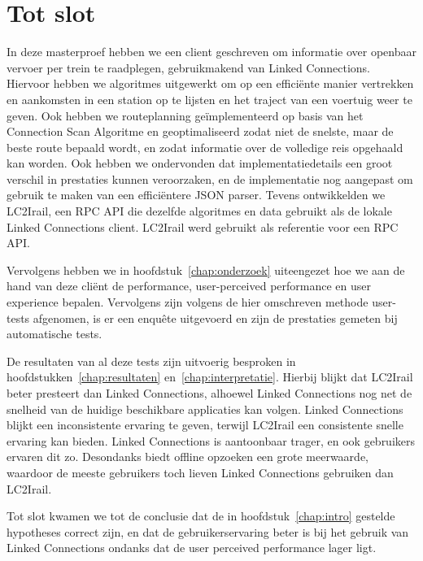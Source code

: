 \section{Tot slot}
	
In deze masterproef hebben we een client geschreven om informatie over openbaar vervoer per trein te raadplegen, gebruikmakend van Linked Connections. Hiervoor hebben we algoritmes uitgewerkt om op een efficiënte manier vertrekken en aankomsten in een station op te lijsten en het traject van een voertuig weer te geven. Ook hebben we routeplanning geïmplementeerd op basis van het Connection Scan Algoritme en geoptimaliseerd zodat niet de snelste, maar de beste route bepaald wordt, en zodat informatie over de volledige reis opgehaald kan worden. Ook hebben we ondervonden dat implementatiedetails een groot verschil in prestaties kunnen veroorzaken, en de implementatie nog aangepast om gebruik te maken van een efficiëntere JSON parser. Tevens ontwikkelden we LC2Irail, een RPC API die dezelfde algoritmes en data gebruikt als de lokale Linked Connections client. LC2Irail werd gebruikt als referentie voor een RPC API.
	
Vervolgens hebben we in hoofdstuk~\ref{chap:onderzoek} uiteengezet hoe we aan de hand van deze cliënt de performance, user-perceived performance en user experience bepalen. Vervolgens zijn volgens de hier omschreven methode user-tests afgenomen, is er een enquête uitgevoerd en zijn de prestaties gemeten bij automatische tests. 
	
De resultaten van al deze tests zijn uitvoerig besproken in hoofdstukken~\ref{chap:resultaten} en~\ref{chap:interpretatie}. Hierbij blijkt dat LC2Irail beter presteert dan Linked Connections, alhoewel Linked Connections nog net de snelheid van de huidige beschikbare applicaties kan volgen. Linked Connections blijkt een inconsistente ervaring te geven, terwijl LC2Irail een consistente snelle ervaring kan bieden. Linked Connections is aantoonbaar trager, en ook gebruikers ervaren dit zo. Desondanks biedt offline opzoeken een grote meerwaarde, waardoor de meeste gebruikers toch lieven Linked Connections gebruiken dan LC2Irail.
	
Tot slot kwamen we tot de conclusie dat de in hoofdstuk~\ref{chap:intro} gestelde hypotheses correct zijn, en dat de gebruikerservaring beter is bij het gebruik van Linked Connections ondanks dat de user perceived performance lager ligt.